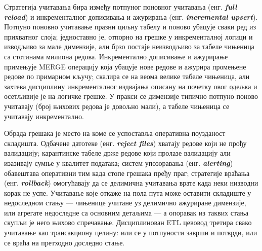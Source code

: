 Стратегија учитавања бира између потпуног поновног учитавања (енг. \textbf{\textit{full reload}}) и инкременталног дописивања и ажурирања (енг. \textbf{\textit{incremental upsert}}). Потпуно поновно учитавање празни циљну табелу и поново убацује сваки ред из прихватног слоја; једноставно је, отпорно на грешке у инкременталној логици и изводљиво за мале димензије, али брзо постаје неизводљиво за табеле чињеница са стотинама милиона редова. Инкрементално дописивање и ажурирање примењује MERGE операцију која убацује нове редове и ажурира промењене редове по примарном кључу; скалира се на веома велике табеле чињеница, али захтева дисциплину инкременталног издвајања описану на почетку овог одељка и осетљивије је на логичке грешке. У пракси се димензије типично потпуно поново учитавају (број њихових редова је довољно мали), а табеле чињеница се учитавају инкрементално.

Обрада грешака је место на коме се успоставља оперативна поузданост складишта. Одбачене датотеке (енг. \textbf{\textit{reject files}}) хватају редове који не прођу валидацију; карантинске табеле држе редове који пролазе валидацију али изазивају сумње у квалитет података; систем упозоравања (енг. \textbf{\textit{alerting}}) обавештава оперативни тим када стопе грешака пређу праг; стратегије враћања (енг. \textbf{\textit{rollback}}) омогућавају да се делимична учитавања врате када неки низводни корак не успе. Учитавање које откаже на пола пута може оставити складиште у недоследном стању — чињенице учитане уз делимично ажуриране димензије, или агрегате недоследне са основним детаљима — а опоравак из таквих стања скупљи је него њихово спречавање. Дисциплинован ETL цевовод третира свако учитавање као трансакциону целину: или се у потпуности заврши и потврди, или се враћа на претходно доследно стање.

